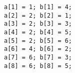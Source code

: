 \begin{lstlisting}
a[1] = 1; b[1] = 4;
a[2] = 2; b[2] = 1;
a[3] = 2; b[3] = 3;
a[4] = 2; b[4] = 5;
a[5] = 2; b[5] = 6;
a[6] = 4; b[6] = 2;
a[7] = 6; b[7] = 3;
a[8] = 6; b[8] = 5;
\end{lstlisting}
% 
% 
% 
% 
% 
% 
